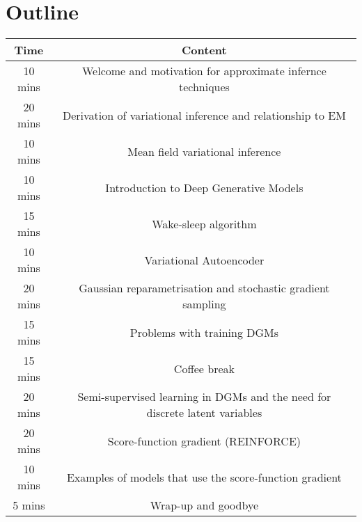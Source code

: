 \section{Outline}

\begin{table}[h!]
\begin{tabular}{|c|c|}
\hline
\textbf{Time} & \textbf{Content} \\
\hline \hline
10 mins & Welcome and motivation for approximate infernce techniques \\
20 mins & Derivation of variational inference and relationship to EM \\
10 mins & Mean field variational inference \\
\hline
10 mins & Introduction to Deep Generative Models \\
15 mins & Wake-sleep algorithm \\
10 mins & Variational Autoencoder \\
20 mins & Gaussian reparametrisation and stochastic gradient sampling \\
15 mins & Problems with training DGMs \\
\hline \hline
15 mins & Coffee break \\
\hline \hline
20 mins & Semi-supervised learning in DGMs and the need for discrete latent variables \\
20 mins & Score-function gradient (REINFORCE) \\
10 mins & Examples of models that use the score-function gradient \\
\hline \hline
5 mins & Wrap-up and goodbye \\
\hline
\end{tabular}
\end{table}